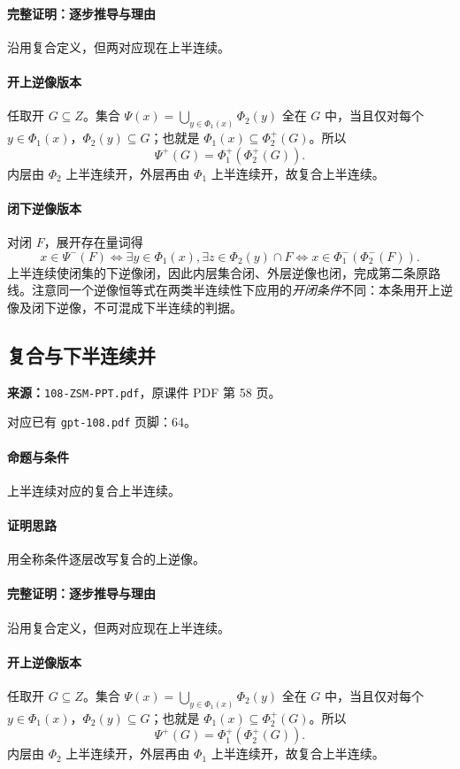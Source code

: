 \paragraph{完整证明：逐步推导与理由}

沿用复合定义，但两对应现在上半连续。
\paragraph{开上逆像版本}任取开 $G\subseteq Z$。集合 $\Psi(x)=\bigcup_{y\in\Phi_1(x)}\Phi_2(y)$ 全在 $G$ 中，当且仅对每个 $y\in\Phi_1(x)$，$\Phi_2(y)\subseteq G$；也就是 $\Phi_1(x)\subseteq\Phi_2^+(G)$。所以
\[\Psi^+(G)=\Phi_1^+(\Phi_2^+(G)).\]
内层由 $\Phi_2$ 上半连续开，外层再由 $\Phi_1$ 上半连续开，故复合上半连续。
\paragraph{闭下逆像版本}对闭 $F$，展开存在量词得
\[x\in\Psi^-(F)\iff\exists y\in\Phi_1(x),\exists z\in\Phi_2(y)\cap F\iff x\in\Phi_1^-(\Phi_2^-(F)).\]
上半连续使闭集的下逆像闭，因此内层集合闭、外层逆像也闭，完成第二条原路线。注意同一个逆像恒等式在两类半连续性下应用的\emph{开闭条件}不同：本条用开上逆像及闭下逆像，不可混成下半连续的判据。

\clearpage\subsection{复合与下半连续并}
\textbf{来源：}\texttt{108-ZSM-PPT.pdf}，原课件 PDF 第 58 页。\par
对应已有 \texttt{gpt-108.pdf} 页脚：64。\par
\paragraph{命题与条件}上半连续对应的复合上半连续。
\paragraph{证明思路}用全称条件逐层改写复合的上逆像。
\paragraph{完整证明：逐步推导与理由}

沿用复合定义，但两对应现在上半连续。
\paragraph{开上逆像版本}任取开 $G\subseteq Z$。集合 $\Psi(x)=\bigcup_{y\in\Phi_1(x)}\Phi_2(y)$ 全在 $G$ 中，当且仅对每个 $y\in\Phi_1(x)$，$\Phi_2(y)\subseteq G$；也就是 $\Phi_1(x)\subseteq\Phi_2^+(G)$。所以
\[\Psi^+(G)=\Phi_1^+(\Phi_2^+(G)).\]
内层由 $\Phi_2$ 上半连续开，外层再由 $\Phi_1$ 上半连续开，故复合上半连续。
